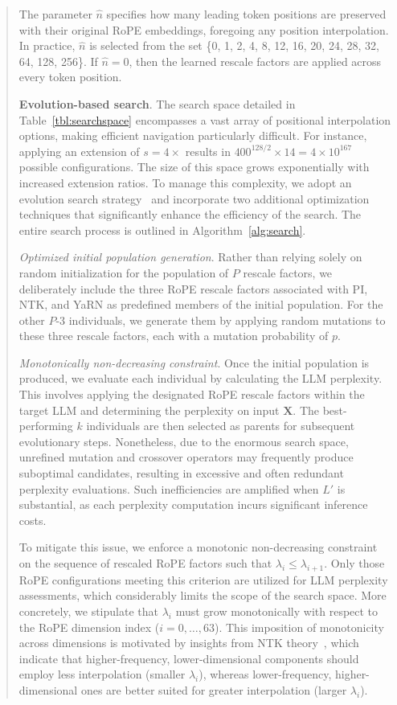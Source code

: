 \begin{abstract}
The parameter $\hat{n}$ specifies how many leading token positions are preserved with their original RoPE embeddings, foregoing any position interpolation. In practice, $\hat{n}$ is selected from the set \{0, 1, 2, 4, 8, 12, 16, 20, 24, 28, 32, 64, 128, 256\}. If $\hat{n}=0$, then the learned rescale factors are applied across every token position.

\textbf{Evolution-based search}. The search space detailed in Table~\ref{tbl:searchspace} encompasses a vast array of positional interpolation options, making efficient navigation particularly difficult. For instance, applying an extension of $s=4\times$ results in $400^{128/2}\times14=4\times10^{167}$ possible configurations. The size of this space grows exponentially with increased extension ratios. To manage this complexity, we adopt an evolution search strategy~\cite{guo2020single} and incorporate two additional optimization techniques that significantly enhance the efficiency of the search. The entire search process is outlined in Algorithm~\ref{alg:search}.

\textit{Optimized initial population generation}. Rather than relying solely on random initialization for the population of $P$ rescale factors, we deliberately include the three RoPE rescale factors associated with PI, NTK, and YaRN as predefined members of the initial population. For the other $P$-3 individuals, we generate them by applying random mutations to these three rescale factors, each with a mutation probability of $p$.

\textit{Monotonically non-decreasing constraint}. Once the initial population is produced, we evaluate each individual by calculating the LLM perplexity. This involves applying the designated RoPE rescale factors within the target LLM and determining the perplexity on input $\mathbf{X}$. The best-performing $k$ individuals are then selected as parents for subsequent evolutionary steps. Nonetheless, due to the enormous search space, unrefined mutation and crossover operators may frequently produce suboptimal candidates, resulting in excessive and often redundant perplexity evaluations. Such inefficiencies are amplified when $L'$ is substantial, as each perplexity computation incurs significant inference costs.

To mitigate this issue, we enforce a monotonic non-decreasing constraint on the sequence of rescaled RoPE factors such that $\lambda_i \leq \lambda_{i+1}$. Only those RoPE configurations meeting this criterion are utilized for LLM perplexity assessments, which considerably limits the scope of the search space. More concretely, we stipulate that $\lambda_i$ must grow monotonically with respect to the RoPE dimension index ($i = 0, \ldots, 63$). This imposition of monotonicity across dimensions is motivated by insights from NTK theory~\cite{jacot2018neural,tancik2020fourier,ntk}, which indicate that higher-frequency, lower-dimensional components should employ less interpolation (smaller $\lambda_i$), whereas lower-frequency, higher-dimensional ones are better suited for greater interpolation (larger $\lambda_i$).


\end{abstract}
